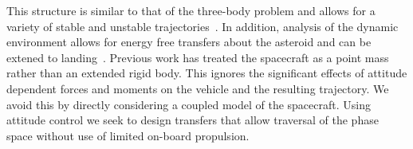 \documentclass[11pt]{article} %
\begin{document}
This structure is similar to that of the three-body problem and allows for a variety of stable and unstable trajectories~\cite{hu2002}.
In addition, analysis of the dynamic environment allows for energy free transfers about the asteroid and can be extened to landing~\cite{herrera2014}.
Previous work has treated the spacecraft as a point mass rather than an extended rigid body.
This ignores the significant effects of attitude dependent forces and moments on the vehicle and the resulting trajectory. 
We avoid this by directly considering a coupled model of the spacecraft.
Using attitude control we seek to design transfers that allow traversal of the phase space without use of limited on-board propulsion.

%
%
\end{document}
